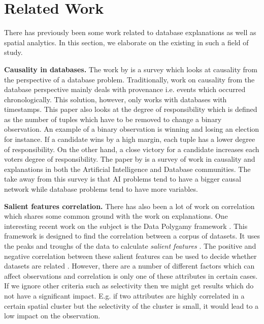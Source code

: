 \section{Related Work}
There has previously been some work related to database explanations as well as spatial analytics. 
In this section, we elaborate on the existing in such a field of study. 

{\bf Causality in databases.} The work by \cite{meliou2010causality} is a survey which looks at causality from the perspective of a database problem. Traditionally, work on causality from the database perspective mainly deals with provenance i.e. events which occurred chronologically. This solution, however, only works with databases with timestamps. This paper also looks at the degree of responsibility which is defined as the number of tuples which have to be removed to change a binary observation. An example of a binary observation is winning and losing an election for instance. If a candidate wins by a high margin, each tuple has a lower degree of responsibility. On the other hand, a close victory for a candidate increases each voters degree of responsibility. The paper by \cite{meliou2014causality} is a survey of work in causality and explanations in both the Artificial Intelligence and Database communities. The take away from this survey is that AI problems tend to have a bigger causal network while database problems tend to have more variables.

{\bf Salient features correlation.} There has also been a lot of work on correlation which shares some common ground with the work on explanations. One interesting recent work on the subject is the Data Polygamy framework \cite{chirigati2016data}. This framework is designed to find the correlation between a corpus of datasets. It uses the peaks and troughs of the data to calculate \textit{salient features} \cite{dunn1986applied}. The positive and negative correlation between these salient features can be used to decide whether datasets are related \cite{su2014supporting}. 
However, there are a number of different factors which can affect observations and correlation is only one of these attributes in certain cases. 
If we ignore other criteria such as selectivity then we might get results which do not have a significant impact. E.g. if two attributes are highly correlated in a certain spatial cluster but the selectivity of the cluster is small, it would lead to a low impact on the observation.

